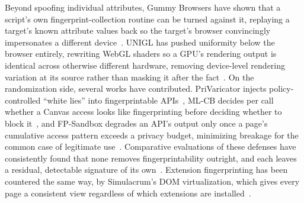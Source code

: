 %
Beyond spoofing individual attributes, Gummy Browsers have shown that a script's own fingerprint-collection routine can be turned against it, replaying a target's known attribute values back so the target's browser convincingly impersonates a different device~\cite{liuGummyBrowsersTargeted2022}.
%
UNIGL has pushed uniformity below the browser entirely, rewriting WebGL shaders so a GPU's rendering output is identical across otherwise different hardware, removing device-level rendering variation at its source rather than masking it after the fact~\cite{wuRenderedPrivateMaking2019}.
%
On the randomization side, several works have contributed. 
%
PriVaricator injects policy-controlled ``white lies'' into fingerprintable APIs~\cite{nikiforakisPriVaricatorDeceivingFingerprinters2015}, ML-CB decides per call whether a Canvas access looks like fingerprinting before deciding whether to block it~\cite{reitingerMLCBMachineLearning2021}, and FP-Sandbox degrades an API's output only once a page's cumulative access pattern exceeds a privacy budget, minimizing breakage for the common case of legitimate use~\cite{torokOnlyPayWhat2023}.
%
Comparative evaluations of these defenses have consistently found that none removes fingerprintability outright, and each leaves a residual, detectable signature of its own~\cite{dattaEvaluatingAntiFingerprintingPrivacy2019}.
%
Extension fingerprinting has been countered the same way, by Simulacrum's DOM virtualization, which gives every page a consistent view regardless of which extensions are installed~\cite{karamiUnleashSimulacrumShifting2022}.


